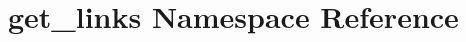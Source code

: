 \hypertarget{namespaceget__links}{\section{get\-\_\-links Namespace Reference}
\label{namespaceget__links}
}
